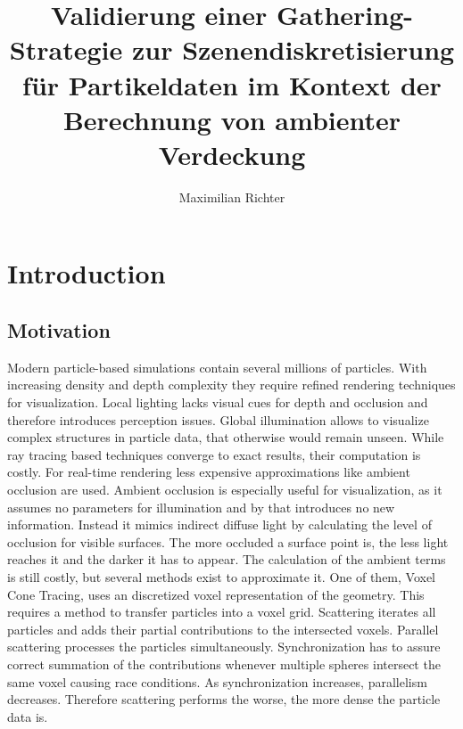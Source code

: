 \documentclass[hyperref,german,diplominf]{cgvpub}
\author{Maximilian Richter}
\title{Validierung einer Gathering-Strategie zur Szenendiskretisierung f\"ur Partikeldaten im Kontext der Berechnung von ambienter Verdeckung}
\begin{document}
\chapter{Introduction}

\section{Motivation}
Modern particle-based simulations contain several millions of particles. With increasing density and depth complexity they require refined rendering techniques for visualization. Local lighting lacks visual cues for depth and occlusion and therefore introduces perception issues.
Global illumination allows to visualize complex structures in particle data, that otherwise would remain unseen. While ray tracing based techniques converge to exact results, their computation is costly. For real-time rendering less expensive approximations like ambient occlusion are used. Ambient occlusion is especially useful for visualization, as it assumes no parameters for illumination and by that introduces no new information. Instead it mimics indirect diffuse light by calculating the level of occlusion for visible surfaces. The more occluded a surface point is, the less light reaches it and the darker it has to appear. The calculation of the ambient terms is still costly, but several methods exist to approximate it. One of them, Voxel Cone Tracing, uses an discretized voxel representation of the geometry. This requires a method to transfer particles into a voxel grid. Scattering iterates all particles and adds their partial contributions to the intersected voxels. Parallel scattering processes the particles simultaneously. Synchronization has to assure correct summation of the contributions whenever multiple spheres intersect the same voxel causing race conditions. As synchronization increases, parallelism decreases. Therefore scattering performs the worse, the more dense the particle data is. 
\end{document}
